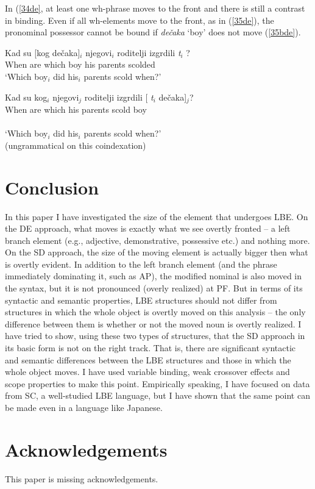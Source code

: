 \documentclass[
    output=paper,
    colorlinks,
    citecolor=brown,
]{langscibook}
\begin{document}
In (\ref{34de}, at least one wh-phrase moves to the front and there is still a contrast in binding. Even if all wh-elements move to the front, as in (\ref{35de}), the pronominal possessor cannot be bound if \textit{dečaka} ‘boy’ does not move (\ref{35bde}).

\begin{exe}
\ex \label{35de}
\begin{xlist}
\ex \label{35ade}
\gll Kad su [kog dečaka]$_{i}$ njegovi$_{i}$ roditelji izgrdili  \textit{t}$_{i}$  ?\\
When are which boy his parents scolded\\
‘Which boy$_{i}$ did his$_{i}$ parents scold when?’ 

\ex \label{35bde}
\gll *Kad su kog$_{i}$    njegovi$_{j}$ roditelji izgrdili [  \textit{t}$_{i}$ dečaka]$_{j}$?\\
When are which his parents scold {} {} boy\\\\
‘Which boy$_{i}$ did his$_{i}$ parents scold when?’\\
(ungrammatical on this coindexation)
\end{xlist}
\end{exe}

\section{Conclusion} \label{s4de}
In this paper I have investigated the size of the element that undergoes LBE. On the DE approach, what moves is exactly what we see overtly fronted – a left branch element (e.g., adjective, demonstrative, possessive etc.) and nothing more. On the SD approach, the size of the moving element is actually bigger then what is overtly evident. In addition to the left branch element (and the phrase immediately dominating it, such as AP), the modified nominal is also moved in the syntax, but it is not pronounced (overly realized) at PF. But in terms of its syntactic and semantic properties, LBE structures should not differ from structures in which the whole object is overtly moved on this analysis – the only difference between them is whether or not the moved noun is overtly realized. I have tried to show, using these two types of structures, that the SD approach in its basic form is not on the right track. That is, there are significant syntactic and semantic differences between the LBE structures and those in which the whole object moves.  I have used variable binding, weak crossover effects and scope properties to make this point. Empirically speaking, I have focused on data from SC, a well-studied LBE language, but I have shown that the same point can be made even in a language like Japanese. 

\section*{Acknowledgements}
This paper is missing acknowledgements. 

{\sloppy
    \printbibliography[heading=subbibliography,notkeyword=this]
}
\end{document}
